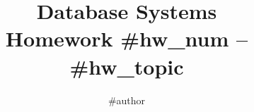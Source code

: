 \documentclass[fleqn]{article}
\title{Database Systems \\
\medskip
\large Homework #{hw_num} -- #{hw_topic}}
\author{#{author}}
\begin{document}
\maketitle

\begin{answers}

    \item

\end{answers}
\end{document}
